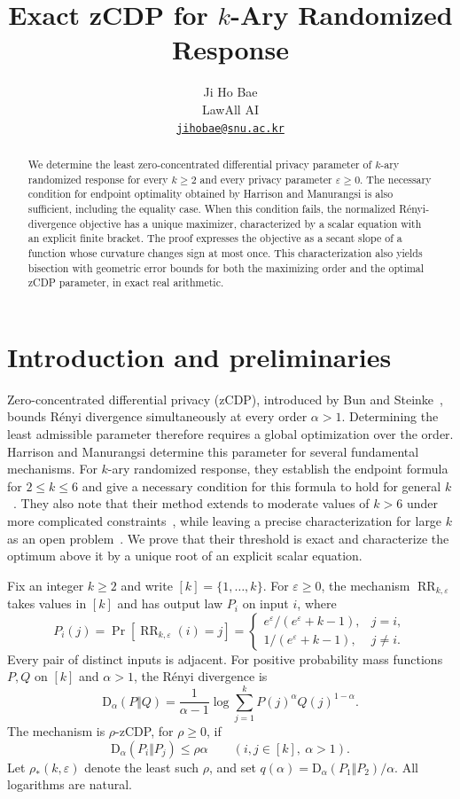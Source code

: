 \documentclass[11pt]{article}
\title{Exact zCDP for $k$-Ary Randomized Response}
\author{Ji Ho Bae\\LawAll AI\\
\href{mailto:jihobae@snu.ac.kr}{\texttt{jihobae@snu.ac.kr}}}
\date{}
\newcommand{\RR}{\operatorname{RR}}
\newcommand{\D}{\mathrm{D}}
\begin{document}
\maketitle

\begin{abstract}
We determine the least zero-concentrated differential privacy parameter of
$k$-ary randomized response for every $k\geq2$ and every privacy parameter
$\varepsilon\geq0$. The necessary condition for endpoint optimality obtained
by Harrison and Manurangsi is also sufficient, including the equality case.
When this condition fails, the normalized R\'enyi-divergence objective has a unique maximizer,
characterized by a scalar equation with an explicit finite bracket.
The proof expresses the objective as a secant slope of a function whose
curvature changes sign at most once. This characterization also yields
bisection with geometric error bounds for both the maximizing order and the
optimal zCDP parameter, in exact real arithmetic.
\end{abstract}

\section{Introduction and preliminaries}

Zero-concentrated differential privacy (zCDP), introduced by Bun and
Steinke~\cite{BS}, bounds R\'enyi divergence simultaneously at every order
$\alpha>1$. Determining the least admissible parameter therefore requires a
global optimization over the order. Harrison and Manurangsi
determine this parameter for several fundamental mechanisms. For $k$-ary
randomized response, they establish the endpoint formula for
$2\leq k\leq6$ and give a necessary condition for this formula to hold for general
$k$~\cite[Theorem~16 and Lemma~17]{HM}. They also note that their method
extends to moderate values of $k>6$ under more complicated
constraints~\cite[footnote~4]{HM}, while leaving a precise
characterization for large $k$ as an open problem~\cite[Section~7]{HM}.
We prove that their threshold is exact and characterize the optimum above it
by a unique root of an explicit scalar equation.

Fix an integer $k\geq2$ and write $[k]=\{1,\ldots,k\}$. For
$\varepsilon\geq0$, the mechanism $\RR_{k,\varepsilon}$ takes values in
$[k]$ and has output law $P_i$ on input $i$, where
\[
 P_i(j)=\Pr[\RR_{k,\varepsilon}(i)=j]
 =\begin{cases}
 e^\varepsilon/(e^\varepsilon+k-1),&j=i,\\
 1/(e^\varepsilon+k-1),&j\ne i.
 \end{cases}
\]
Every pair of distinct inputs is adjacent. For positive probability mass
functions $P,Q$ on $[k]$ and $\alpha>1$, the R\'enyi divergence is
\[
 \D_\alpha(P\Vert Q)
 =\frac{1}{\alpha-1}\log\sum_{j=1}^k
 P(j)^\alpha Q(j)^{1-\alpha}.
\]
The mechanism is $\rho$-zCDP, for $\rho\geq0$, if
\[
 \D_\alpha(P_i\Vert P_j)\leq\rho\alpha
 \qquad(i,j\in[k],\ \alpha>1).
\]
Let $\rho_*(k,\varepsilon)$ denote the least such $\rho$, and set
$q(\alpha)=\D_\alpha(P_1\Vert P_2)/\alpha$. All logarithms are natural.
\end{document}
